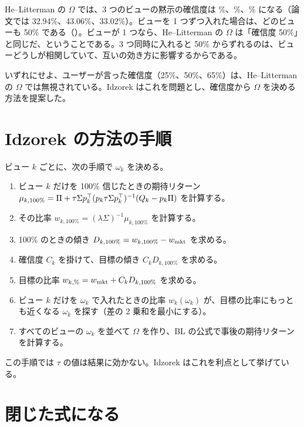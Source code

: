 He--Litterman の $\Omega$ では、3 つのビューの黙示の確信度は \%、\%、\% になる（論文では 32.94\%、43.06\%、33.02\%）。ビューを 1 つずつ入れた場合は、どのビューも 50\% である（）。ビューが 1 つなら、He--Litterman の $\Omega$ は「確信度 50\%」と同じだ、ということである。3 つ同時に入れると 50\% からずれるのは、ビューどうしが相関していて、互いの効き方に影響するからである。

いずれにせよ、ユーザーが言った確信度（25\%、50\%、65\%）は、He--Litterman の $\Omega$ では無視されている。Idzorek はこれを問題とし、確信度から $\Omega$ を決める方法を提案した。

\section{Idzorek の方法の手順}

ビュー $k$ ごとに、次の手順で $\omega_k$ を決める。

\begin{enumerate}
\item ビュー $k$ だけを 100\% 信じたときの期待リターン $\mu_{k,100\%}=\Pi+\tau\Sigma p_k^{\top}(p_k\tau\Sigma p_k^{\top})^{-1}(Q_k-p_k\Pi)$ を計算する。
\item その比率 $w_{k,100\%}=(\lambda\Sigma)^{-1}\mu_{k,100\%}$ を計算する。
\item 100\% のときの傾き $D_{k,100\%}=w_{k,100\%}-w_{\mathrm{mkt}}$ を求める。
\item 確信度 $C_k$ を掛けて、目標の傾き $C_k D_{k,100\%}$ を求める。
\item 目標の比率 $w_{k,\%}=w_{\mathrm{mkt}}+C_kD_{k,100\%}$ を求める。
\item ビュー $k$ だけを $\omega_k$ で入れたときの比率 $w_k(\omega_k)$ が、目標の比率にもっとも近くなる $\omega_k$ を探す（差の 2 乗和を最小にする）。
\item すべてのビューの $\omega_k$ を並べて $\Omega$ を作り、BL の公式で事後の期待リターンを計算する。
\end{enumerate}

この手順では $\tau$ の値は結果に効かない。Idzorek はこれを利点として挙げている。

\section{閉じた式になる}\label{sec:idz-closed}

